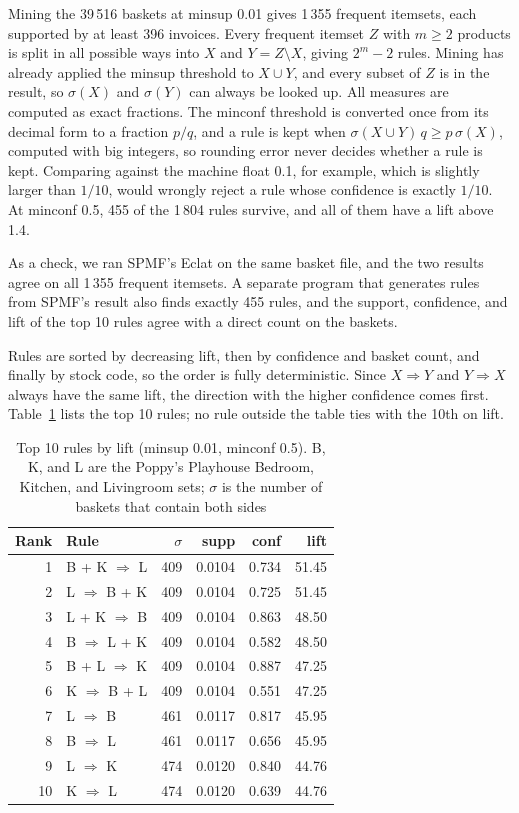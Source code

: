 Mining the 39\,516 baskets at minsup 0.01 gives 1\,355 frequent itemsets, each supported
by at least 396 invoices. Every frequent itemset $Z$ with $m \ge 2$ products is split in
all possible ways into $X$ and $Y = Z \setminus X$, giving $2^m - 2$ rules. Mining has
already applied the minsup threshold to $X \cup Y$, and every subset of $Z$ is in the
result, so $\sigma(X)$ and $\sigma(Y)$ can always be looked up. All measures are computed
as exact fractions. The minconf threshold is converted once from its decimal form to a
fraction $p/q$, and a rule is kept when $\sigma(X \cup Y)\, q \ge p\, \sigma(X)$, computed
with big integers, so rounding error never decides whether a rule is kept. Comparing
against the machine float 0.1, for example, which is slightly larger than $1/10$, would
wrongly reject a rule whose confidence is exactly $1/10$. At minconf 0.5, 455 of the
1\,804 rules survive, and all of them have a lift above 1.4.

As a check, we ran SPMF's Eclat on the same basket file, and the two results agree on all
1\,355 frequent itemsets. A separate program that generates rules from SPMF's result also
finds exactly 455 rules, and the support, confidence, and lift of the top 10 rules agree
with a direct count on the baskets.

Rules are sorted by decreasing lift, then by confidence and basket count, and finally by
stock code, so the order is fully deterministic. Since $X \Rightarrow Y$ and
$Y \Rightarrow X$ always have the same lift, the direction with the higher confidence
comes first. Table~\ref{tab:top-rules} lists the top 10 rules; no rule outside the table
ties with the 10th on lift.

\begin{table}[t]
\centering
\caption{Top 10 rules by lift (minsup 0.01, minconf 0.5). B, K, and L are the Poppy's
Playhouse Bedroom, Kitchen, and Livingroom sets; $\sigma$ is the number of baskets that
contain both sides}
\label{tab:top-rules}
\begin{tabular}{rlrrrr}
\hline
Rank & Rule & $\sigma$ & supp & conf & lift \\
\hline
1 & B + K $\Rightarrow$ L & 409 & 0.0104 & 0.734 & 51.45 \\
2 & L $\Rightarrow$ B + K & 409 & 0.0104 & 0.725 & 51.45 \\
3 & L + K $\Rightarrow$ B & 409 & 0.0104 & 0.863 & 48.50 \\
4 & B $\Rightarrow$ L + K & 409 & 0.0104 & 0.582 & 48.50 \\
5 & B + L $\Rightarrow$ K & 409 & 0.0104 & 0.887 & 47.25 \\
6 & K $\Rightarrow$ B + L & 409 & 0.0104 & 0.551 & 47.25 \\
7 & L $\Rightarrow$ B & 461 & 0.0117 & 0.817 & 45.95 \\
8 & B $\Rightarrow$ L & 461 & 0.0117 & 0.656 & 45.95 \\
9 & L $\Rightarrow$ K & 474 & 0.0120 & 0.840 & 44.76 \\
10 & K $\Rightarrow$ L & 474 & 0.0120 & 0.639 & 44.76 \\
\hline
\end{tabular}
\end{table}


